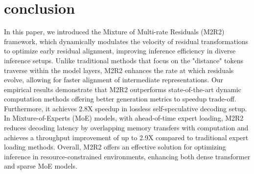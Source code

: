 \section{conclusion}
In this paper, we introduced the Mixture of Multi-rate Residuals (M2R2) framework, which dynamically modulates the velocity of residual transformations to optimize early residual alignment, improving inference efficiency in diverse inference setups. Unlike traditional methods that focus on the "distance" tokens traverse within the model layers, M2R2 enhances the rate at which residuals evolve, allowing for faster alignment of intermediate representations. Our empirical results demonstrate that M2R2 outperforms state-of-the-art dynamic computation methods offering better generation metrics to speedup trade-off. Furthermore, it achieves 2.8X speedup in lossless self-speculative decoding setup. In Mixture-of-Experts (MoE) models, with ahead-of-time expert loading, M2R2 reduces decoding latency by overlapping memory transfers with computation and achieves a throughput improvement of up to 2.9X compared to traditional expert loading methods. Overall, M2R2 offers an effective solution for optimizing inference in resource-constrained environments, enhancing both dense transformer and sparse MoE models.